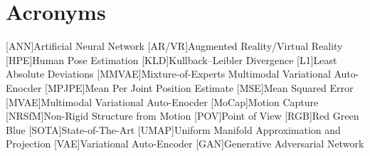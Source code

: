 \chapter*{Acronyms}

\begin{acronym}[TBD]
    [ANN]{Artificial Neural Network}
    [AR/VR]{Augmented Reality/Virtual Reality}
    [HPE]{Human Pose Estimation}
    [KLD]{Kullback–Leibler Divergence}
    [L1]{Least Absolute Deviations}
    [MMVAE]{Mixture-of-Experts Multimodal Variational Auto-Enocder}
    [MPJPE]{Mean Per Joint Position Estimate}
    [MSE]{Mean Squared Error}
    [MVAE]{Multimodal Variational Auto-Enocder}
    [MoCap]{Motion Capture}
    [NRSfM]{Non-Rigid Structure from Motion}
    [POV]{Point of View}
    [RGB]{Red Green Blue}
    [SOTA]{State-of-The-Art}
    [UMAP]{Uniform Manifold Approximation and Projection}
    [VAE]{Variational Auto-Encoder}
    [GAN]{Generative Adversarial Network}
\end{acronym}

